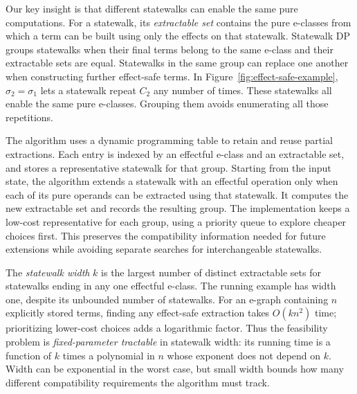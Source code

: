 Our key insight is that different statewalks can enable the same pure computations.
For a statewalk, its \emph{extractable set} contains the pure e-classes
  from which a term can be built using only the effects on that statewalk.
Statewalk DP groups statewalks when their final terms belong to the same e-class
  and their extractable sets are equal.
Statewalks in the same group can replace one another when constructing further effect-safe terms.
In Figure~\ref{fig:effect-safe-example}, $\sigma_2=\sigma_1$ lets a statewalk repeat $C_2$
  any number of times.
These statewalks all enable the same pure e-classes.
Grouping them avoids enumerating all those repetitions.

The algorithm uses a dynamic programming table to retain and reuse partial extractions.
Each entry is indexed by an effectful e-class and an extractable set,
  and stores a representative statewalk for that group.
Starting from the input state, the algorithm extends a statewalk with an effectful operation
  only when each of its pure operands can be extracted using that statewalk.
It computes the new extractable set and records the resulting group.
The implementation keeps a low-cost representative for each group,
  using a priority queue to explore cheaper choices first.
This preserves the compatibility information needed for future extensions
  while avoiding separate searches for interchangeable statewalks.

The \emph{statewalk width} $k$ is the largest number of distinct extractable sets
  for statewalks ending in any one effectful e-class.
The running example has width one, despite its unbounded number of statewalks.
For an e-graph containing $n$ explicitly stored terms, finding any effect-safe extraction
  takes $O(kn^2)$ time; prioritizing lower-cost choices adds a logarithmic factor.
Thus the feasibility problem is \emph{fixed-parameter tractable} in statewalk width:
  its running time is a function of $k$ times a polynomial in $n$
  whose exponent does not depend on $k$.
Width can be exponential in the worst case, but small width bounds how many
  different compatibility requirements the algorithm must track.

